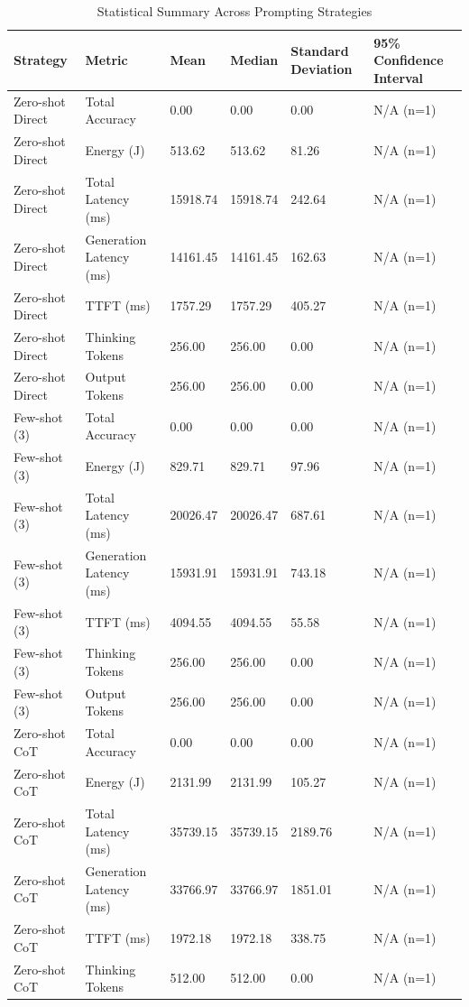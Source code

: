 \begin{table}
\caption{Statistical Summary Across Prompting Strategies}
\label{tab:statistical_summary}
\begin{tabular}{llllll}
\toprule
Strategy & Metric & Mean & Median & Standard Deviation & 95\% Confidence Interval \\
\midrule
Zero-shot Direct & Total Accuracy & 0.00 & 0.00 & 0.00 & N/A (n=1) \\
Zero-shot Direct & Energy (J) & 513.62 & 513.62 & 81.26 & N/A (n=1) \\
Zero-shot Direct & Total Latency (ms) & 15918.74 & 15918.74 & 242.64 & N/A (n=1) \\
Zero-shot Direct & Generation Latency (ms) & 14161.45 & 14161.45 & 162.63 & N/A (n=1) \\
Zero-shot Direct & TTFT (ms) & 1757.29 & 1757.29 & 405.27 & N/A (n=1) \\
Zero-shot Direct & Thinking Tokens & 256.00 & 256.00 & 0.00 & N/A (n=1) \\
Zero-shot Direct & Output Tokens & 256.00 & 256.00 & 0.00 & N/A (n=1) \\
Few-shot (3) & Total Accuracy & 0.00 & 0.00 & 0.00 & N/A (n=1) \\
Few-shot (3) & Energy (J) & 829.71 & 829.71 & 97.96 & N/A (n=1) \\
Few-shot (3) & Total Latency (ms) & 20026.47 & 20026.47 & 687.61 & N/A (n=1) \\
Few-shot (3) & Generation Latency (ms) & 15931.91 & 15931.91 & 743.18 & N/A (n=1) \\
Few-shot (3) & TTFT (ms) & 4094.55 & 4094.55 & 55.58 & N/A (n=1) \\
Few-shot (3) & Thinking Tokens & 256.00 & 256.00 & 0.00 & N/A (n=1) \\
Few-shot (3) & Output Tokens & 256.00 & 256.00 & 0.00 & N/A (n=1) \\
Zero-shot CoT & Total Accuracy & 0.00 & 0.00 & 0.00 & N/A (n=1) \\
Zero-shot CoT & Energy (J) & 2131.99 & 2131.99 & 105.27 & N/A (n=1) \\
Zero-shot CoT & Total Latency (ms) & 35739.15 & 35739.15 & 2189.76 & N/A (n=1) \\
Zero-shot CoT & Generation Latency (ms) & 33766.97 & 33766.97 & 1851.01 & N/A (n=1) \\
Zero-shot CoT & TTFT (ms) & 1972.18 & 1972.18 & 338.75 & N/A (n=1) \\
Zero-shot CoT & Thinking Tokens & 512.00 & 512.00 & 0.00 & N/A (n=1) \\

\end{tabular}
\end{table}
